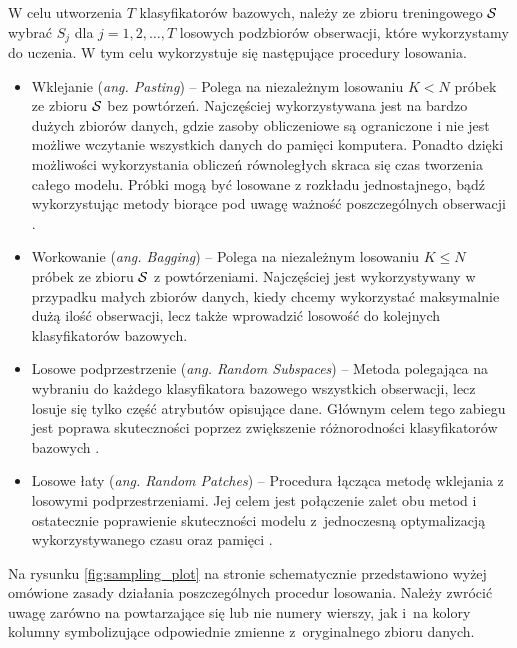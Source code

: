 \documentclass[inzynierska]{pwr_wmat_praca_dyplomowa}
\theoremstyle{plain}
\numberwithin{theorem}{chapter}
\theoremstyle{definition}
\numberwithin{theorem}{chapter}
\begin{document}
W celu utworzenia $T$ klasyfikatorów bazowych, należy ze zbioru treningowego $\mathcal{S}$ wybrać $S_j$ dla $j=1,2,\dots,T$ losowych podzbiorów obserwacji, które wykorzystamy do uczenia. W tym celu wykorzystuje się następujące procedury losowania.

\begin{itemize}
	\item Wklejanie (\textit{ang. Pasting}) -- Polega na niezależnym losowaniu $K < N$ próbek ze zbioru $\mathcal{S}$ bez powtórzeń. Najczęściej wykorzystywana jest na bardzo dużych zbiorów danych, gdzie zasoby obliczeniowe są ograniczone i nie jest możliwe wczytanie wszystkich danych do pamięci komputera. Ponadto dzięki możliwości wykorzystania obliczeń równoległych skraca się czas tworzenia całego modelu. Próbki mogą być losowane z rozkładu jednostajnego, bądź wykorzystując metody biorące pod uwagę ważność poszczególnych obserwacji \cite{Pasting}.
	\item Workowanie (\textit{ang. Bagging}) -- Polega na niezależnym losowaniu $K \leq N$ próbek ze zbioru $\mathcal{S}$ z powtórzeniami. Najczęściej jest wykorzystywany w przypadku małych zbiorów danych, kiedy chcemy wykorzystać maksymalnie dużą ilość obserwacji, lecz także wprowadzić losowość do kolejnych klasyfikatorów bazowych.
	\item Losowe podprzestrzenie (\textit{ang. Random Subspaces}) -- Metoda polegająca na wybraniu do każdego klasyfikatora bazowego wszystkich obserwacji, lecz losuje się tylko część atrybutów opisujące dane. Głównym celem tego zabiegu jest poprawa skuteczności poprzez zwiększenie różnorodności klasyfikatorów bazowych \cite{Random_Subspace}.
	\item Losowe łaty (\textit{ang. Random Patches}) -- Procedura łącząca metodę wklejania z losowymi podprzestrzeniami. Jej celem jest połączenie zalet obu metod i ostatecznie poprawienie skuteczności modelu z~jednoczesną optymalizacją wykorzystywanego czasu oraz pamięci \cite{Random_Patches}.
\end{itemize}
Na rysunku \ref{fig:sampling_plot} na stronie \pageref{fig:sampling_plot} schematycznie przedstawiono wyżej omówione zasady działania poszczególnych procedur losowania. Należy zwrócić uwagę zarówno na powtarzające się lub nie numery wierszy, jak i~na kolory kolumny symbolizujące odpowiednie zmienne z~oryginalnego zbioru danych.
\end{document}
